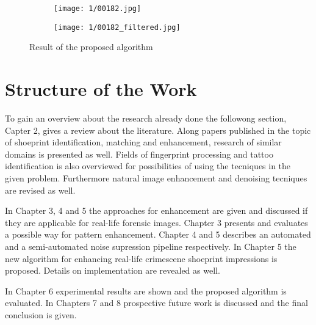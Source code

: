\documentclass[draft,final]{vutinfth} %
\begin{document}
\begin{figure}[h]
  \centering
  \begin{subfigure}[b]{0.45\columnwidth}
    \centering
    \texttt{[image: 1/00182.jpg]}
    \label{fig:intro:orig}
  \end{subfigure}
  \begin{subfigure}[b]{0.45\columnwidth}
    \centering
    \texttt{[image: 1/00182\_filtered.jpg]}
    \label{fig:intro:enhanced}
  \end{subfigure}
  \caption{Result of the proposed algorithm}
  \label{fig:example}
\end{figure}

\section{Structure of the Work}
\par
To gain an overview about the research already done the followong section, Capter 2, gives a review about the literature. 
Along papers published in the topic of shoeprint identification, matching and enhancement, research of similar domains is presented as well.
Fields of fingerprint processing and tattoo identification is also overviewed for possibilities of using the tecniques in the given problem.
Furthermore natural image enhancement and denoising tecniques are revised as well.
\par
In Chapter 3, 4 and 5 the approaches for enhancement are given and discussed if they are applicable for real-life forensic images.
Chapter 3 presents and evaluates a possible way for pattern enhancement.
Chapter 4 and 5 describes an automated and a semi-automated noise supression pipeline respectively.
In Chapter 5 the new algorithm for enhancing real-life crimescene shoeprint impressions is proposed.
Details on implementation are revealed as well.
\par
In Chapter 6 experimental results are shown and the proposed algorithm is evaluated.
In Chapters 7 and 8 prospective future work is discussed and the final conclusion is given. 
\end{document}

